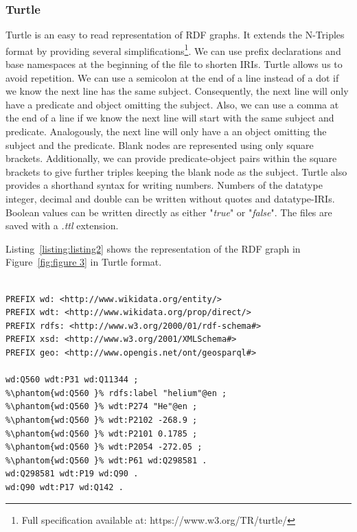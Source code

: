 \subsubsection{Turtle}
Turtle is an easy to read representation of RDF graphs. It extends the N-Triples format by providing several simplifications\footnote{Full specification available at: https://www.w3.org/TR/turtle/}. We can use prefix declarations and base namespaces at the beginning of the file to shorten IRIs. Turtle allows us to avoid repetition. We can use a semicolon at the end of a line instead of a dot if we know the next line has the same subject. Consequently, the next line will only have a predicate and object omitting the subject. Also, we can use a comma at the end of a line if we know the next line will start with the same subject and predicate. Analogously, the next line will only have a an object omitting the subject and the predicate. Blank nodes are represented using only square brackets. Additionally, we can provide predicate-object pairs within the square brackets to give further triples keeping the blank node as the subject. Turtle also provides a shorthand syntax for writing numbers. Numbers of the datatype integer, decimal and double can be written without quotes and datatype-IRIs. Boolean values can be written directly as either "\textit{true}" or "\textit{false}". The files are saved with a \textit{.ttl} extension.

Listing~\ref{listing:listing2} shows the representation of the RDF graph in Figure~\ref{fig:figure 3} in Turtle format. 

\begin{minipage}{\linewidth}
\begin{lstlisting}[label=listing:listing2, caption={RDF graph represented in Turtle syntax}, language=SPARQL]

PREFIX wd: <http://www.wikidata.org/entity/>
PREFIX wdt: <http://www.wikidata.org/prop/direct/>
PREFIX rdfs: <http://www.w3.org/2000/01/rdf-schema#>
PREFIX xsd: <http://www.w3.org/2001/XMLSchema#>
PREFIX geo: <http://www.opengis.net/ont/geosparql#>

wd:Q560 wdt:P31 wd:Q11344 ;
%\phantom{wd:Q560 }% rdfs:label "helium"@en ;
%\phantom{wd:Q560 }% wdt:P274 "He"@en ;
%\phantom{wd:Q560 }% wdt:P2102 -268.9 ;
%\phantom{wd:Q560 }% wdt:P2101 0.1785 ;
%\phantom{wd:Q560 }% wdt:P2054 -272.05 ;
%\phantom{wd:Q560 }% wdt:P61 wd:Q298581 .
wd:Q298581 wdt:P19 wd:Q90 .
wd:Q90 wdt:P17 wd:Q142 .

\end{lstlisting}
\end{minipage}



